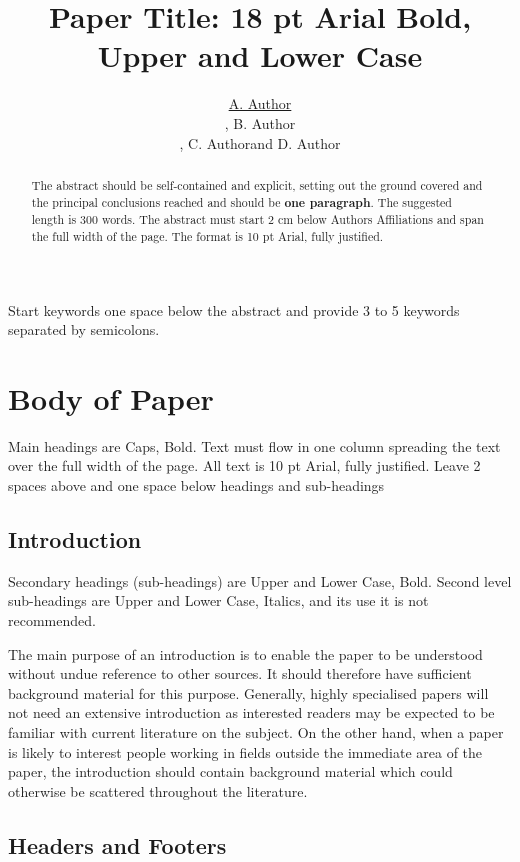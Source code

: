 \documentclass[a4paper]{article}
\title{Paper Title: 18 pt Arial Bold, Upper and Lower Case}
\author{\underline{A. Author}
\address[A1]{\it{A affiliation,
GPO Box 123,
Somewhere, SomeCountry (AuthorA@email.zz, AuthorC@email.zz)}}, B.
Author\address[B1]{\it{B affiliation,
GPO Box 987,
Somewhere else, SomeCountry (AuthorB@email.zz, AuthorD@email.zz)}}, C.
Author\addressmark[A1] and D.
Author\addressmark[B1]}
\begin{document}

\begin{abstract}
The abstract should be self-contained and explicit, setting out
the ground covered and the principal conclusions reached and
should be \textbf{one paragraph}.  The suggested length is 300 words.
The abstract must start 2 cm below Authors Affiliations and span
the full width of the page.  The format is 10 pt Arial,
fully justified.
\end{abstract}
\begin{keyword}
Start keywords one space below the abstract and provide 3 to 5
keywords separated by semicolons.
\end{keyword}

\maketitle


\section{Body of Paper}

Main headings are Caps, Bold.  Text must flow in one column spreading the text over the full width of the page.  All
text is 10 pt Arial, fully justified. Leave 2 spaces above
and one space below headings and sub-headings

\subsection{Introduction}

Secondary headings (sub-headings) are Upper and Lower Case, Bold.
Second level sub-headings are Upper and Lower Case, Italics, and its use it is not recommended.

The main purpose of an introduction is to enable the paper to be understood without undue reference to other sources.  It should therefore have sufficient background material for this purpose.  Generally, highly specialised papers will not need an extensive introduction as interested readers may be expected to be familiar with current literature on the subject.  On the other hand, when a paper is likely to interest people working in fields outside the immediate area of the paper, the introduction should contain background material which could otherwise be scattered throughout the literature.

\subsection{Headers and Footers}
\end{document}
